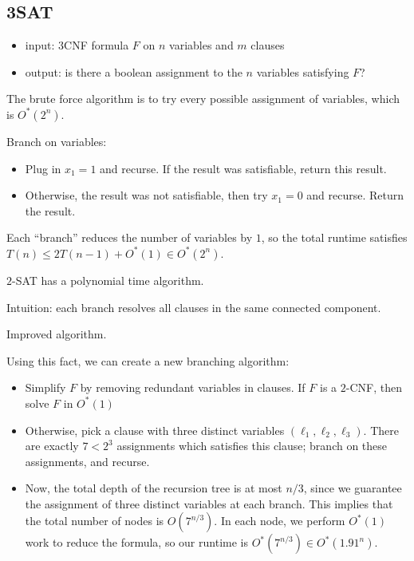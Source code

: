 \subsection{3SAT}

\begin{itemize}
    \item input: $3$CNF formula $F$ on $n$ variables and $m$ clauses
    \item output: is there a boolean assignment to the $n$ variables satisfying $F$?
\end{itemize}

The brute force algorithm is to try every possible assignment of variables, which is $O^*(2^n)$. 

Branch on variables: 
\begin{itemize}
    \item Plug in $x_1=1$ and recurse. If the result was satisfiable, return this result.
    \item Otherwise, the result was not satisfiable, then try $x_1=0$ and recurse. Return the result. 
\end{itemize}

Each ``branch'' reduces the number of variables by $1$, so the total runtime satisfies $T(n)\leq 2T(n-1)+O^*(1)\in O^*(2^n)$. 

\begin{theorem}
\claimlabel

$2$-SAT has a polynomial time algorithm. 
\end{theorem}

Intuition: each branch resolves all clauses in the same connected component.

\begin{example}
\exlabel

Improved algorithm.
\end{example}

Using this fact, we can create a new branching algorithm: 
\begin{itemize}
    \item Simplify $F$ by removing redundant variables in clauses. If $F$ is a $2$-CNF, then solve $F$ in $O^*(1)$
    \item Otherwise, pick a clause with three distinct variables $(\ell_1, \ell_2, \ell_3)$. There are exactly $7<2^3$ assignments which satisfies this clause; branch on these assignments, and recurse. 
    \item Now, the total depth of the recursion tree is at most $n/3$, since we guarantee the assignment of three distinct variables at each branch. This implies that the total number of nodes is $O(7^{n/3})$. In each node, we perform $O^*(1)$ work to reduce the formula, so our runtime is $O^*(7^{n/3})\in O^*(1.91^n)$. 
\end{itemize}

